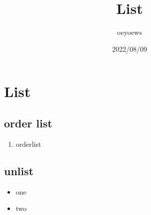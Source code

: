 \documentclass{article}
\title{List}
\author{oeyoews}
\date{2022/08/09}
\begin{document}
\maketitle

\section{List}%
\label{List}

\subsection{order list}%
\label{sub:order list}

\begin{enumerate}
  \item orderlist
\end{enumerate}

\subsection{unlist}%
\label{sub:unlist}

\begin{itemize}
  \item one
  \item two
\end{itemize}
\end{document}
